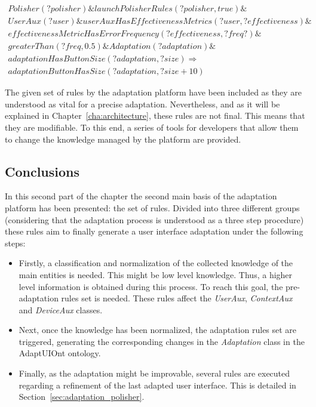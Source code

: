 \footnotesize
\begin{equation} \label{ec:post_adaptation_rule}
  \begin{align*} 
  Polisher(?polisher) \& launchPolisherRules(?polisher, true) \&\\
  UserAux(?user) \& userAuxHasEffectivenessMetrics(?user, ?effectiveness) \& \\
  effectivenessMetricHasErrorFrequency(?effectiveness, ?freq?) \&\\
  greaterThan(?freq, 0.5) \& Adaptation(?adaptation) \&\\
  adaptationHasButtonSize(?adaptation, ?size)
  \Rightarrow \\
  adaptationButtonHasSize(?adaptation, ?size + 10)
  \end{align*}
\end{equation}
\normalsize



The given set of rules by the adaptation platform have been included as they are
understood as vital for a precise adaptation. Nevertheless, and as it will be
explained in Chapter~\ref{cha:architecture}, these rules are not final. This
means that they are modifiable. To this end, a series of tools for developers
that allow them to change the knowledge managed by the platform are provided.


\subsection{Conclusions}
\label{sec:rules_conclusions}

In this second part of the chapter the second main basis of the adaptation platform
has been presented: the set of rules. Divided into three different groups
(considering that the adaptation process is understood as a three step procedure)
these rules aim to finally generate a user interface adaptation under the following
steps:

\begin{itemize}
  \item Firstly, a classification and normalization of the collected knowledge of
  the main entities is needed. This might be low level knowledge. Thus, a higher
  level information is obtained during this process. To reach this goal, the
  pre-adaptation rules set is needed. These rules affect the \textit{UserAux},
  \textit{ContextAux} and \textit{DeviceAux} classes.
  
  \item Next, once the knowledge has been normalized, the adaptation rules set
  are triggered, generating the corresponding changes in the \textit{Adaptation}
  class in the AdaptUIOnt ontology.
  
  \item Finally, as the adaptation might be improvable, several rules are executed
  regarding a refinement of the last adapted user interface. This is detailed
  in Section~\ref{sec:adaptation_polisher}.
\end{itemize}